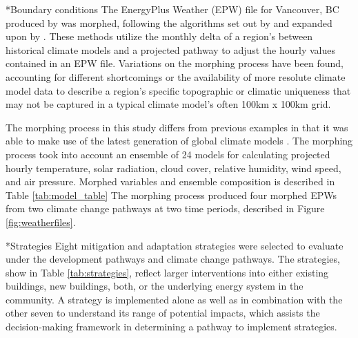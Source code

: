 \documentclass[twocolumn, a4paper,10pt]{article}
\makeatletter
\renewcommand\subsection{\@startsection{subsection}{1}{\z@}{\z@}{\z@}{\normalfont\normalsize\bfseries}}
\renewcommand\subsection{\@startsection{subsection}{1}{\z@}{\z@}{0.1pt}{\normalfont\normalsize\bfseries}}
\makeatother
\begin{document}
\subsection*{Boundary conditions}
The EnergyPlus Weather (EPW) file for Vancouver, BC produced by \citet{CWEC 2016 citation} was morphed, following the algorithms set out by \citet{Belcher} and expanded upon by \citet{CCworldweathergen}. These methods utilize the monthly delta of a region's between historical climate models and a projected pathway \citep{SSPs} to adjust the hourly values contained in an EPW file. Variations on the morphing process have been found, accounting for different shortcomings or the availability of more resolute climate model data to describe a region's specific topographic or climatic uniqueness that may not be captured in a typical climate model's often 100km x 100km grid.

The morphing process in this study differs from previous examples in that it was able to make use of the latest generation of global climate models \citep{CMIP6 text}. The morphing process took into account an ensemble of 24 models for calculating projected hourly temperature, solar radiation, cloud cover, relative humidity, wind speed, and air pressure. Morphed variables and ensemble composition is described in Table \ref{tab:model_table} The morphing process produced four morphed EPWs from two climate change pathways at two time periods, described in Figure \ref{fig:weatherfiles}.

\subsection*{Strategies}
Eight mitigation and adaptation strategies were selected to evaluate under the development pathways and climate change pathways. The strategies, show in Table \ref{tab:strategies}, reflect larger interventions into either existing buildings, new buildings, both, or the underlying energy system in the community. A strategy is implemented alone as well as in combination with the other seven to understand its range of potential impacts, which assists the decision-making framework in determining a pathway to implement strategies.
\end{document}

